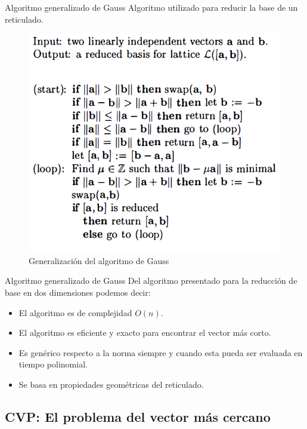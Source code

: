 \begin{frame}{Algoritmo generalizado de Gauss}
Algoritmo utilizado para reducir la base de un reticulado. 
    \begin{figure}
        \centering
        \includegraphics[width=0.65\linewidth]{figures/lattice_gaussAlg.png}
        \caption{Generalización del algoritmo de Gauss}
    \end{figure}
\end{frame}

\begin{frame}{Algoritmo generalizado de Gauss}
Del algoritmo presentado para la reducción de base en dos dimensiones podemos decir:
\begin{itemize}
    \item El algoritmo es de complejidad $O(n)$.
    \item El algoritmo es eficiente y exacto para encontrar el vector más corto.
    \item Es genérico respecto a la norma siempre y cuando esta pueda ser evaluada en tiempo polinomial.
    \item Se basa en propiedades geométricas del reticulado. 
\end{itemize}
\end{frame}

\subsection{CVP: El problema del vector más cercano}

